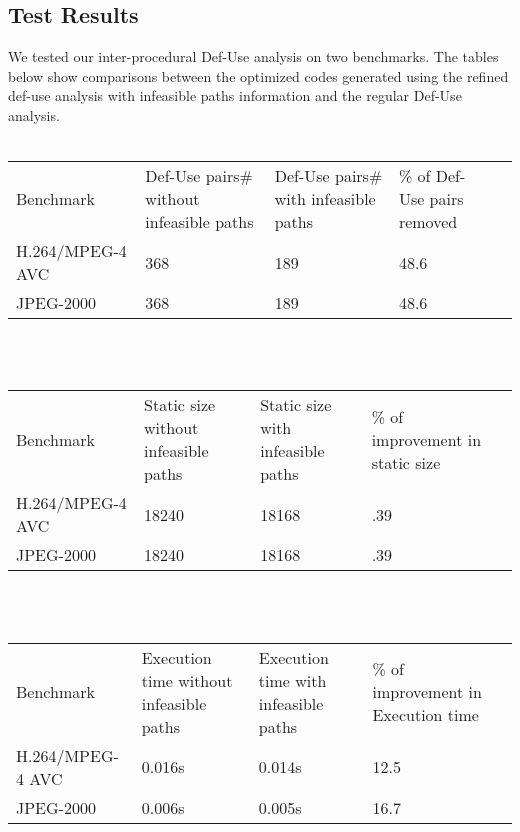 \documentclass{article}
\begin{document}
\subsection{Test Results}
We tested our inter-procedural Def-Use analysis on two benchmarks. The tables below show comparisons between the optimized codes generated using the refined def-use analysis with infeasible paths information and the regular Def-Use analysis. 
~\\~
\begin{adjustbox}{center}
\renewcommand{\arraystretch}{2}
\begin{tabular}{| C{3cm} | C{3cm} | C{3cm} | C{3cm} | C{3cm} |}
\hline
Benchmark & Def-Use pairs\# without infeasible paths & Def-Use pairs\# with infeasible paths & \% of Def-Use pairs removed \\  
H.264/MPEG-4 AVC & 368 & 189 & 48.6  \\ 
JPEG-2000 & 368 & 189 & 48.6  \\ 

\end{tabular}
\end{adjustbox}
~\\~
\begin{adjustbox}{center}
\renewcommand{\arraystretch}{2}
\begin{tabular}{| C{3cm} | C{3cm} | C{3cm} | C{3cm} | C{3cm} |}
\hline
Benchmark & Static size without infeasible paths & Static size with infeasible paths & \% of improvement in static size \\  
H.264/MPEG-4 AVC & 18240 & 18168 & .39  \\ 
JPEG-2000 & 18240 & 18168 & .39  \\ 
\end{tabular}
\end{adjustbox}
~\\~
\begin{adjustbox}{center}
\renewcommand{\arraystretch}{2}
\begin{tabular}{| C{3cm} | C{3cm} | C{3cm} | C{3cm} | C{3cm} |}
\hline
Benchmark & Execution time without infeasible paths & Execution time with infeasible paths & \% of improvement in Execution time \\  
H.264/MPEG-4 AVC & 0.016s & 0.014s & 12.5  \\ 
JPEG-2000 & 0.006s & 0.005s & 16.7  \\ 
\end{tabular}
\end{adjustbox}
\end{document}
